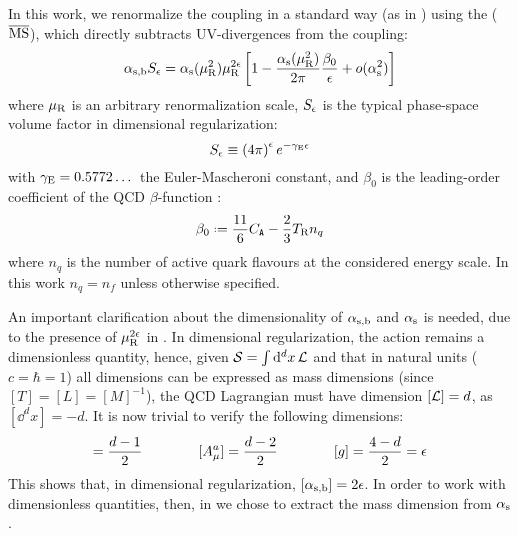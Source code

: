 In this work, we renormalize the coupling in a standard way (as in \cite{Catani-1998}) using the  ($ \overline{\text{MS}} $), which directly subtracts UV-divergences from the coupling:
\begin{equation}
  \alpha_\text{s,b} S_\epsilon = \alpha_\text{s}(\mu_\text{R}^2) \mu_\text{R}^{2\epsilon} \left[ 1 - \frac{\alpha_\text{s}(\mu_\text{R}^2)}{2\pi} \frac{\beta_0}{\epsilon} + o(\alpha_\text{s}^2) \right]
  \label{eq:msb-def}
\end{equation}
where $ \mu_\text{R} $ is an arbitrary renormalization scale, $ S_\epsilon $ is the typical phase-space volume factor in dimensional regularization:
\begin{equation}
  S_\epsilon \equiv \left( 4\pi \right)^\epsilon e^{-\gamma_\text{E} \epsilon}
\end{equation}
with $ \gamma_\text{E} = 0.5772\dots $ the Euler-Mascheroni constant, and $ \beta_0 $ is the leading-order coefficient of the QCD $ \beta $-function :
\begin{equation}
  \beta_0 \defeq \frac{11}{6} \caa - \frac{2}{3} \ttr n_q
\end{equation}
where $ n_q $ is the number of active quark flavours at the considered energy scale. In this work $ n_q = n_f $ unless otherwise specified.

An important clarification about the dimensionality of $ \alpha_\text{s,b} $ and $ \alpha_\text{s} $ is needed, due to the presence of $ \mu_\text{R}^{2\epsilon} $ in . In dimensional regularization, the action remains a dimensionless quantity, hence, given $ \mathcal{S} = \int \mathrm{d}^dx \, \mathcal{L} $ and that in natural units ($ c = \hbar = 1 $) all dimensions can be expressed as mass dimensions (since $ [T] = [L] = [M]^{-1} $), the QCD Lagrangian  must have dimension $ [\mathcal{L}] = d $, as $ [\dd^dx] = -d $. It is now trivial to verify the following dimensions:
\begin{equation*}
  [\Psi] = \frac{d - 1}{2}
  \qquad \qquad
  [A_\mu^a] = \frac{d - 2}{2}
  \qquad \qquad
  [g] = \frac{4 - d}{2} = \de
\end{equation*}
This shows that, in dimensional regularization, $ [\alpha_\text{s,b}] = 2\epsilon $. In order to work with dimensionless quantities, then, in  we chose to extract the mass dimension from $ \alpha_\text{s} $.

